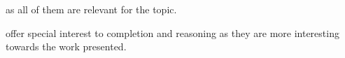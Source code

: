 as all of them are relevant for the topic.

offer special interest to completion and reasoning as they are more interesting towards the work presented.






